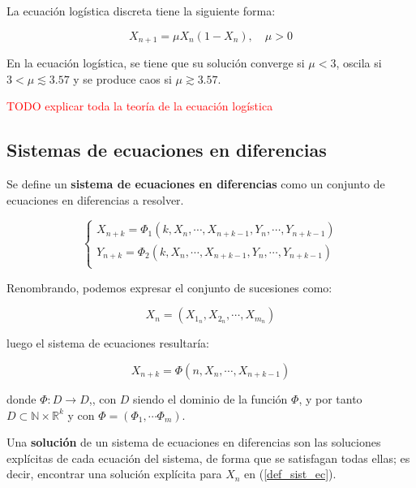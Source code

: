 \begin{definition}
La ecuación logística discreta tiene la siguiente forma:

$$X_{n+1} = \mu X_n(1-X_n),\quad \mu > 0$$
\end{definition}

\begin{proposition}
En la ecuación logística, se tiene que su solución converge si $\mu < 3$, oscila si $3 < \mu \lesssim 3.57$ y se produce caos si $\mu \gtrsim 3.57$. 
\end{proposition}

\textcolor{red}{TODO explicar toda la teoría de la ecuación logística}

\subsection{Sistemas de ecuaciones en diferencias}

\begin{definition}
Se define un \textbf{sistema de ecuaciones en diferencias} como un conjunto de ecuaciones en diferencias a resolver.

\begin{equation}
\begin{cases}
X_{n+k} = \Phi_1(k, X_n, \cdots , X_{n+k-1}, Y_n, \cdots, Y_{n+k-1}) \\
Y_{n+k} = \Phi_2(k, X_n, \cdots , X_{n+k-1}, Y_n, \cdots, Y_{n+k-1}) \\
\end{cases}
\end{equation}

Renombrando, podemos expresar el conjunto de sucesiones como:

\begin{equation}
X_n = (X_{1_n}, X_{2_n}, \cdots , X_{m_n})
\end{equation}

luego el sistema de ecuaciones resultaría:

\begin{equation}
\label{def_sist_ec}
X_{n+k} = \Phi (n, X_n, \cdots , X_{n+k-1})
\end{equation}


donde $\Phi : D \rightarrow D$,, con $D$ siendo el dominio de la función $\Phi$, y por tanto $D\subset \mathbb{N}\times\mathbb{R}^k$ y con $\Phi = (\Phi_1, \cdots \Phi_m)$.

\end{definition}

\begin{definition}
Una \textbf{solución} de un sistema de ecuaciones en diferencias son las soluciones explícitas de cada ecuación del sistema, de forma que se satisfagan todas ellas; es decir, encontrar una solución explícita para $X_n$ en (\ref{def_sist_ec}).
\end{definition}

